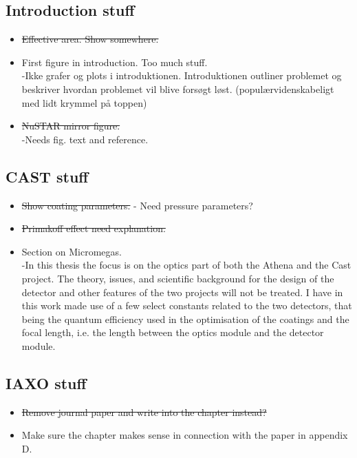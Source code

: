 \subsection{Introduction stuff}
\begin{itemize}
  \item \st{Effective area. Show somewhere.}\\
  \item First figure in introduction. Too much stuff.\\
      -Ikke grafer og plots i introduktionen. Introduktionen outliner problemet og beskriver hvordan problemet vil blive forsøgt løst. (populærvidenskabeligt med lidt krymmel på toppen)
  \item \st{NuSTAR mirror figure.}\\
      -Needs fig. text and reference.



\end{itemize}


\subsection{CAST stuff}
\begin{itemize}
  \item \st{ Show coating parameters.}
      - Need pressure parameters?
  \item \st{Primakoff effect need explanation.}
  \item Section on Micromegas.\\
      -In this thesis the focus is on the optics part of both the Athena and the Cast project. The theory, issues, and scientific background for the design of the detector and other features of the two projects will not be treated. I have in this work made use of a few select constants related to the two detectors, that being the quantum efficiency used in the optimisation of the coatings and the focal length, i.e. the length between the optics module and the detector module.
\end{itemize}

\subsection{IAXO stuff}
\begin{itemize}
  \item \st{ Remove journal paper and write into the chapter instead?}
  \item Make sure the chapter makes sense in connection with the paper in appendix D.
\end{itemize}
